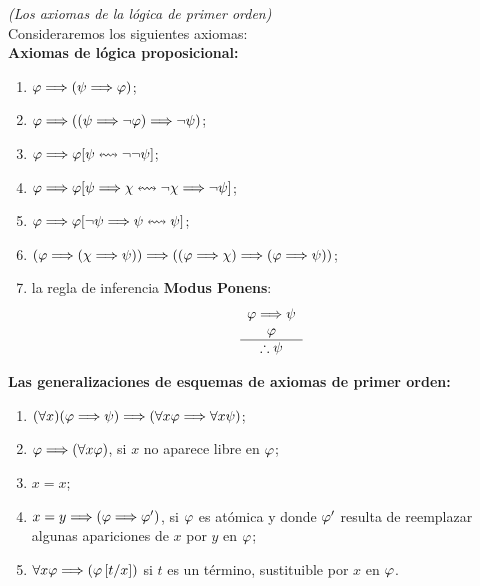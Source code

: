 \begin{defn} \textit{(Los axiomas de la lógica de primer orden)} {\label{axiomas}}\\
    Consideraremos los siguientes axiomas:\\
    \textbf{Axiomas de lógica proposicional:}
    \begin{enumerate}
        \item $\varphi\Longrightarrow(\psi\Longrightarrow\varphi)$;
        \item $\varphi\Longrightarrow((\psi\Longrightarrow\neg\varphi)\Longrightarrow\neg\psi)$;
        \item $\varphi\Longrightarrow\varphi[\psi\leftrightsquigarrow\neg\neg\psi]$;
        \item $\varphi\Longrightarrow\varphi[\psi\Longrightarrow\chi\leftrightsquigarrow\neg\chi\Longrightarrow\neg\psi]$;
        \item $\varphi\Longrightarrow\varphi[\neg\psi\Longrightarrow\psi\leftrightsquigarrow\psi]$;
        \item $(\varphi\Longrightarrow(\chi\Longrightarrow\psi))\Longrightarrow((\varphi\Longrightarrow\chi)\Longrightarrow(\varphi\Longrightarrow\psi))$;
        \item la regla de inferencia \textbf{Modus Ponens}:
        \[
        \begin{array}{c}
          \varphi \Longrightarrow \psi \\
          \varphi \\
          \hline
          \therefore \psi
        \end{array}
        \]
    \end{enumerate}
    \textbf{Las generalizaciones de esquemas de axiomas de primer orden:}
    \begin{enumerate}
        \item $(\forall x)(\varphi\Longrightarrow\psi)\Longrightarrow(\forall x\varphi\Longrightarrow\forall x\psi)$;
        \item $\varphi\Longrightarrow(\forall x\varphi)$, si $x$ no aparece libre en $\varphi$;
        \item $x=x$;
        \item $x=y\Longrightarrow(\varphi\Longrightarrow\varphi')$, si $\varphi$ es atómica y donde $\varphi'$ resulta de reemplazar algunas apariciones de $x$ por $y$ en $\varphi$;
        \item $\forall x\varphi\Longrightarrow(\varphi\left[t/x\right])$ si $t$ es un término, sustituible por $x$ en $\varphi$.
    \end{enumerate}
\end{defn}

